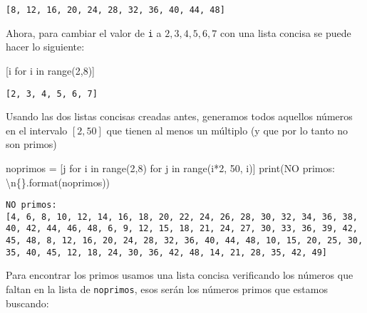 \documentclass[
  letterpaper,
  DIV=11,
  numbers=noendperiod]{scrreprt}
\newenvironment{Shaded}{\begin{snugshade}}{\end{snugshade}}
\newcommand{\BuiltInTok}[1]{\textcolor[rgb]{0.00,0.23,0.31}{#1}}
\newcommand{\CharTok}[1]{\textcolor[rgb]{0.13,0.47,0.30}{#1}}
\newcommand{\ControlFlowTok}[1]{\textcolor[rgb]{0.00,0.23,0.31}{#1}}
\newcommand{\DecValTok}[1]{\textcolor[rgb]{0.68,0.00,0.00}{#1}}
\newcommand{\KeywordTok}[1]{\textcolor[rgb]{0.00,0.23,0.31}{#1}}
\newcommand{\NormalTok}[1]{\textcolor[rgb]{0.00,0.23,0.31}{#1}}
\newcommand{\OperatorTok}[1]{\textcolor[rgb]{0.37,0.37,0.37}{#1}}
\newcommand{\SpecialCharTok}[1]{\textcolor[rgb]{0.37,0.37,0.37}{#1}}
\newcommand{\StringTok}[1]{\textcolor[rgb]{0.13,0.47,0.30}{#1}}
\begin{document}
\begin{verbatim}
[8, 12, 16, 20, 24, 28, 32, 36, 40, 44, 48]
\end{verbatim}

Ahora, para cambiar el valor de \texttt{i} a \(2,3,4,5,6,7\) con una
lista concisa se puede hacer lo siguiente:

\begin{Shaded}
\begin{Highlighting}[]
\NormalTok{[i }\ControlFlowTok{for}\NormalTok{ i }\KeywordTok{in} \BuiltInTok{range}\NormalTok{(}\DecValTok{2}\NormalTok{,}\DecValTok{8}\NormalTok{)]}
\end{Highlighting}
\end{Shaded}

\begin{verbatim}
[2, 3, 4, 5, 6, 7]
\end{verbatim}

Usando las dos listas concisas creadas antes, generamos todos aquellos
números en el intervalo \([2,50]\) que tienen al menos un múltiplo (y
que por lo tanto no son primos)

\begin{Shaded}
\begin{Highlighting}[]
\NormalTok{noprimos }\OperatorTok{=}\NormalTok{ [j }\ControlFlowTok{for}\NormalTok{ i }\KeywordTok{in} \BuiltInTok{range}\NormalTok{(}\DecValTok{2}\NormalTok{,}\DecValTok{8}\NormalTok{) }\ControlFlowTok{for}\NormalTok{ j }\KeywordTok{in} \BuiltInTok{range}\NormalTok{(i}\OperatorTok{*}\DecValTok{2}\NormalTok{, }\DecValTok{50}\NormalTok{, i)]}
\BuiltInTok{print}\NormalTok{(}\StringTok{\textquotesingle{}NO primos: }\CharTok{\textbackslash{}n}\SpecialCharTok{\{\}}\StringTok{\textquotesingle{}}\NormalTok{.}\BuiltInTok{format}\NormalTok{(noprimos))}
\end{Highlighting}
\end{Shaded}

\begin{verbatim}
NO primos: 
[4, 6, 8, 10, 12, 14, 16, 18, 20, 22, 24, 26, 28, 30, 32, 34, 36, 38, 40, 42, 44, 46, 48, 6, 9, 12, 15, 18, 21, 24, 27, 30, 33, 36, 39, 42, 45, 48, 8, 12, 16, 20, 24, 28, 32, 36, 40, 44, 48, 10, 15, 20, 25, 30, 35, 40, 45, 12, 18, 24, 30, 36, 42, 48, 14, 21, 28, 35, 42, 49]
\end{verbatim}

Para encontrar los primos usamos una lista concisa verificando los
números que faltan en la lista de \texttt{noprimos}, esos serán los
números primos que estamos buscando:
\end{document}
